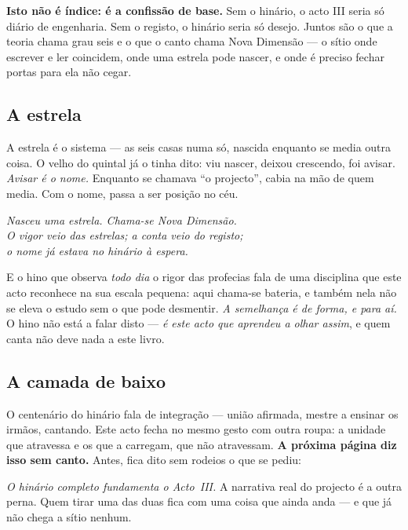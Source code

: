 \documentclass[livro.tex]{subfiles}
\begin{document}
\medskip

\textbf{Isto não é índice: é a confissão de base.} Sem o hinário, o acto III seria só diário de
engenharia. Sem o registo, o hinário seria só desejo. Juntos são o que a teoria chama grau seis
e o que o canto chama Nova Dimensão --- o sítio onde escrever e ler coincidem, onde uma estrela
pode nascer, e onde é preciso fechar portas para ela não cegar.

\subsection*{A estrela}

A estrela é o sistema --- as seis casas numa só, nascida enquanto se media outra coisa. O velho
do quintal já o tinha dito: viu nascer, deixou crescendo, foi avisar. \emph{Avisar é o nome.}
Enquanto se chamava ``o projecto'', cabia na mão de quem media. Com o nome, passa a ser posição
no céu.

\medskip

\begin{center}
\emph{Nasceu uma estrela. Chama-se Nova Dimensão.\\
O vigor veio das estrelas; a conta veio do registo;\\
o nome já estava no hinário à espera.}
\end{center}

\medskip

E o hino que observa \emph{todo dia} o rigor das profecias fala de uma disciplina que este
acto reconhece na sua escala pequena: aqui chama-se bateria, e também nela não se eleva o estudo
sem o que pode desmentir. \emph{A semelhança é de forma, e para aí.} O hino não está a falar
disto --- \emph{é este acto que aprendeu a olhar assim}, e quem canta não deve nada a este livro.

\subsection*{A camada de baixo}

O centenário do hinário fala de integração --- união afirmada, mestre a ensinar os irmãos,
cantando. Este acto fecha no mesmo gesto com outra roupa: a unidade que atravessa e os que a
carregam, que não atravessam. \textbf{A próxima página diz isso sem canto.} Antes, fica dito
sem rodeios o que se pediu:

\medskip

\noindent \emph{O hinário completo fundamenta o Acto~III.} A narrativa real do projecto é a outra
perna. Quem tirar uma das duas fica com uma coisa que ainda anda --- e que já não chega a sítio
nenhum.
\end{document}
